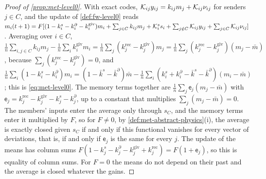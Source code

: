 \begin{proof}[Proof of \cref{prop:met-level0}]
With exact codes, $\mathcal{K}_{ij}y_{ij}=k_{ij}m_j+\mathcal{K}_{ij}\nu_{ij}$ for senders $j\in C$, and the update of \cref{def:fw-level0} reads $m_i(t+1)=F[(1-k^s_i-k^\partial_i-k^{\mathrm{giv}}_i)m_i+\sum_{j\in C}k_{ij}m_j+\mathcal{K}^s_is_i+\sum_{j\notin C}\mathcal{K}_{ij}y_{ij}+\sum_{j\in C}\mathcal{K}_{ij}\nu_{ij}]$. Averaging over $i\in C$, $\frac1n\sum_{i,j\in C}k_{ij}m_j-\frac1n\sum_ik^{\mathrm{giv}}_im_i=\frac1n\sum_j(k^{\mathrm{rec}}_j-k^{\mathrm{giv}}_j)m_j=\frac1n\sum_j(k^{\mathrm{rec}}_j-k^{\mathrm{giv}}_j)(m_j-\bar m)$, because $\sum_j(k^{\mathrm{rec}}_j-k^{\mathrm{giv}}_j)=0$, and $\frac1n\sum_i(1-k^s_i-k^\partial_i)m_i=(1-\bar k^s-\bar k^\partial)\bar m-\frac1n\sum_i(k^s_i+k^\partial_i-\bar k^s-\bar k^\partial)(m_i-\bar m)$; this is \eqref{eq:met-level0}. The memory terms together are $\frac1n\sum_j\mathsf e_j(m_j-\bar m)$ with $\mathsf e_j=k^{\mathrm{rec}}_j-k^{\mathrm{giv}}_j-k^s_j-k^\partial_j$, up to a constant that multiplies $\sum_j(m_j-\bar m)=0$. The members' inputs enter the average only through $s_C$, and the memory terms enter it multiplied by $F$, so for $F\neq0$, by \cref{def:met-abstract-physics}(i), the average is exactly closed given $s_C$ if and only if this functional vanishes for every vector of deviations, that is, if and only if $\mathsf e_j$ is the same for every $j$. The update of the means has column sums $F(1-k^s_j-k^\partial_j-k^{\mathrm{giv}}_j+k^{\mathrm{rec}}_j)=F(1+\mathsf e_j)$, so this is equality of column sums. For $F=0$ the means do not depend on their past and the average is closed whatever the gains.
\end{proof}

